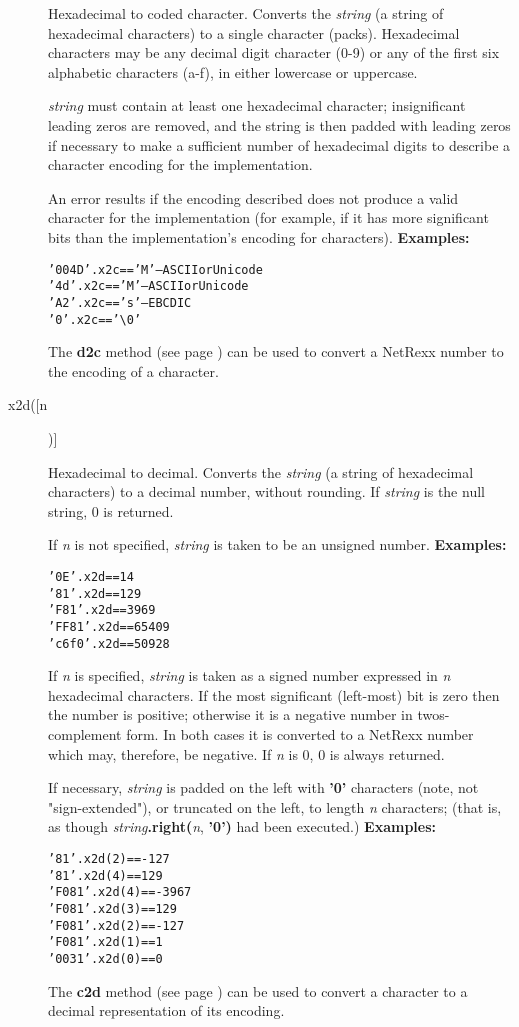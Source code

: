\begin{description}
Hexadecimal to coded character.
Converts the \emph{string} (a string of hexadecimal characters) to
a single character (packs).
Hexadecimal characters may be any decimal digit character (0-9) or any
of the first six alphabetic characters (a-f), in either lowercase or
uppercase.
 
\emph{string} must contain at least one hexadecimal character;
insignificant leading zeros are removed, and the string is then padded
with leading zeros if necessary to make a sufficient number of
hexadecimal digits to describe a character encoding for the
implementation.
 
An error results if the encoding described does not produce a valid
character for the implementation (for example, if it has more
significant bits than the implementation's encoding for characters).
 \textbf{Examples:}
\begin{alltt}
'004D'.x2c == 'M' -- ASCII or Unicode
'4d'.x2c   == 'M' -- ASCII or Unicode
'A2'.x2c   == 's' -- EBCDIC
'0'.x2c    == '\textbackslash 0'
\end{alltt}
 The  \textbf{d2c} method (see page \pageref{refd2c})  can be used to
convert a NetRexx number to the encoding of a character.
\item[x2d([n])]\label{refx2d}

Hexadecimal to decimal.
Converts the \emph{string} (a string of hexadecimal characters) to
a decimal number, without rounding.
If \emph{string} is the null string, 0 is returned.
 
If \emph{n} is not specified, \emph{string} is taken to
be an unsigned number.
 \textbf{Examples:}
\begin{alltt}
'0E'.x2d    == 14
'81'.x2d    == 129
'F81'.x2d   == 3969
'FF81'.x2d  == 65409
'c6f0'.x2d  == 50928
\end{alltt}
 
If \emph{n} is specified, \emph{string} is taken as a signed
number expressed in \emph{n} hexadecimal characters.
If the most significant (left-most) bit is zero then the number is
positive; otherwise it is a negative number in twos-complement form.
In both cases it is converted to a NetRexx number which may,
therefore, be negative.
If \emph{n} is 0, 0 is always returned.
 
If necessary, \emph{string} is padded on the left
with \textbf{'0'} characters (note, not "sign-extended"), or
truncated on the left, to length \emph{n} characters; (that is, as
though \emph{string}\textbf{.right(}\emph{n}, \textbf{'0')}
had been executed.)
 \textbf{Examples:}
\begin{alltt}
'81'.x2d(2)   == -127
'81'.x2d(4)   == 129
'F081'.x2d(4) == -3967
'F081'.x2d(3) == 129
'F081'.x2d(2) == -127
'F081'.x2d(1) == 1
'0031'.x2d(0) == 0
\end{alltt}
 The  \textbf{c2d} method (see page \pageref{refc2d})  can be used to convert
a character to a decimal representation of its encoding.
\end{description}
\index{,}
\index{,}
\index{,}
\index{,}
